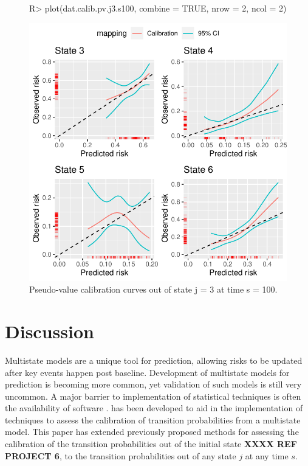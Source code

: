\documentclass[article,shortnames]{jss}
\begin{document}
\begin{figure}
\centering
\begin{Schunk}
\begin{Sinput}
R> plot(dat.calib.pv.j3.s100, combine = TRUE, nrow = 2, ncol = 2)
\end{Sinput}
\end{Schunk}
\includegraphics{calibmsm-jss-20230613-016}
\caption{\label{fig:pvj3s100} Pseudo-value calibration curves out of state j =  3 at time s = 100.}
\end{figure}


\section{Discussion} \label{sec:discussion}

Multistate models are a unique tool for prediction, allowing risks to be updated after key events happen post baseline. Development of multistate models for prediction is becoming more common, yet validation of such models is still very uncommon. A major barrier to implementation of statistical techniques is often the availability of software \citep{Pullenayegum2016}.  has been developed to aid in the implementation of techniques to assess the calibration of transition probabilities from a multistate model. This paper has extended previously proposed methods for assessing the calibration of the transition probabilities out of the initial state \textbf{XXXX REF PROJECT 6}, to the transition probabilities out of any state $j$ at any time $s$.
\end{document}
